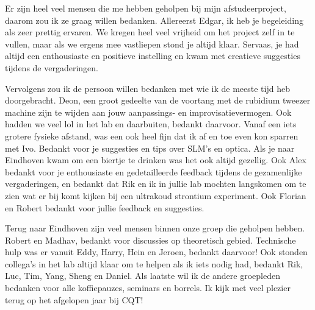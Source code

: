 \noindent Er zijn heel veel mensen die me hebben geholpen bij mijn afstudeerproject, daarom zou ik ze graag willen bedanken. 
Allereerst Edgar, ik heb je begeleiding als zeer prettig ervaren. 
We kregen heel veel vrijheid om het project zelf in te vullen, maar als we ergens mee vastliepen stond je altijd klaar.
Servaas, je had altijd een enthousiaste en positieve instelling en kwam met creatieve suggesties tijdens de vergaderingen.

Vervolgens zou ik de persoon willen bedanken met wie ik de meeste tijd heb doorgebracht.
Deon, een groot gedeelte van de voortang met de rubidium tweezer machine zijn te wijden aan jouw aanpassings- en improvisatievermogen. Ook hadden we veel lol in het lab en daarbuiten, bedankt daarvoor. 
Vanaf een iets grotere fysieke afstand, was een ook heel fijn dat ik af en toe even kon sparren met Ivo. 
Bedankt voor je suggesties en tips over SLM's en optica. Als je naar Eindhoven kwam om een biertje te drinken was het ook altijd gezellig.
Ook Alex bedankt voor je enthousiaste en gedetailleerde feedback tijdens de gezamenlijke vergaderingen, en bedankt dat Rik en ik in jullie lab mochten langskomen om te zien wat er bij komt kijken bij een ultrakoud strontium experiment. 
Ook Florian en Robert bedankt voor jullie feedback en suggesties.

Terug naar Eindhoven zijn veel mensen binnen onze groep die geholpen hebben. 
Robert en Madhav, bedankt voor discussies op theoretisch gebied. 
Technische hulp was er vanuit Eddy, Harry, Hein en Jeroen, bedankt daarvoor! 
Ook stonden collega's in het lab altijd klaar om te helpen als ik iets nodig had, bedankt Rik, Luc, Tim, Yang, Sheng en Daniel. 
Als laatste wil ik de andere groepleden bedanken voor alle koffiepauzes, seminars en borrels. 
Ik kijk met veel plezier terug op het afgelopen jaar bij CQT! 
